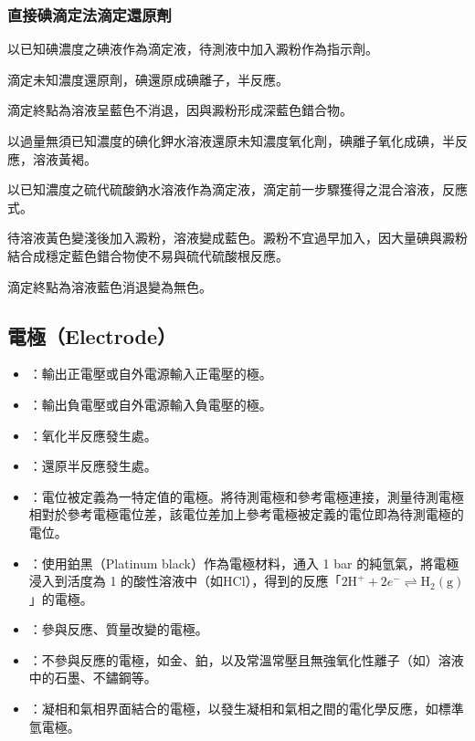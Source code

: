 \documentclass[a4paper,12pt]{article}
\begin{document}
\subsubsection{直接碘滴定法滴定還原劑}
\ben
\item 以已知碘濃度之碘液作為滴定液，待測液中加入澱粉作為指示劑。
\item 滴定未知濃度還原劑，碘還原成碘離子，半反應。
\item 滴定終點為溶液呈藍色不消退，因與澱粉形成深藍色錯合物。
\een
{}
\ben
\item 以過量無須已知濃度的碘化鉀水溶液還原未知濃度氧化劑，碘離子氧化成碘，半反應，溶液黃褐。
\item 以已知濃度之硫代硫酸鈉水溶液作為滴定液，滴定前一步驟獲得之混合溶液，反應式。
\item 待溶液黃色變淺後加入澱粉，溶液變成藍色。澱粉不宜過早加入，因大量碘與澱粉結合成穩定藍色錯合物使不易與硫代硫酸根反應。
\item 滴定終點為溶液藍色消退變為無色。
\een
\subsection{電極（Electrode）}
\begin{itemize}
\item {}：輸出正電壓或自外電源輸入正電壓的極。
\item {}：輸出負電壓或自外電源輸入負電壓的極。
\item {}：氧化半反應發生處。
\item {}：還原半反應發生處。
\item {}：電位被定義為一特定值的電極。將待測電極和參考電極連接，測量待測電極相對於參考電極電位差，該電位差加上參考電極被定義的電位即為待測電極的電位。
\item {}：使用鉑黑（Platinum black）作為電極材料，通入 1 bar 的純氫氣，將電極浸入到活度為 1 的酸性溶液中（如HCl），得到的反應「$\text{2H}^+ + 2e^- \rightleftharpoons \text{H}_2 (\text{g})$」的電極。
\item {}：參與反應、質量改變的電極。
\item {}：不參與反應的電極，如金、鉑，以及常溫常壓且無強氧化性離子（如）溶液中的石墨、不鏽鋼等。
\item {}：凝相和氣相界面結合的電極，以發生凝相和氣相之間的電化學反應，如標準氫電極。
\end{itemize}
\end{document}
